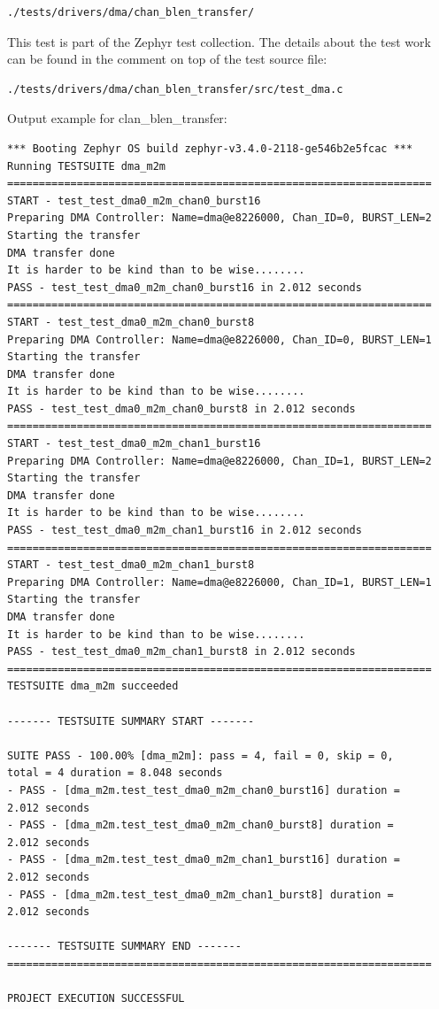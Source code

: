 \documentclass[11pt,a4paper,oneside]{article}
\begin{document}
\begin{lstlisting}
./tests/drivers/dma/chan_blen_transfer/
\end{lstlisting}

This test is part of the Zephyr test collection. The details about the
test work can be found in the comment on top of the test source file:
\begin{lstlisting}
./tests/drivers/dma/chan_blen_transfer/src/test_dma.c
\end{lstlisting}

Output example for clan\_blen\_transfer:

\begin{lstlisting}
*** Booting Zephyr OS build zephyr-v3.4.0-2118-ge546b2e5fcac ***
Running TESTSUITE dma_m2m
===================================================================
START - test_test_dma0_m2m_chan0_burst16
Preparing DMA Controller: Name=dma@e8226000, Chan_ID=0, BURST_LEN=2
Starting the transfer
DMA transfer done
It is harder to be kind than to be wise........
PASS - test_test_dma0_m2m_chan0_burst16 in 2.012 seconds
===================================================================
START - test_test_dma0_m2m_chan0_burst8
Preparing DMA Controller: Name=dma@e8226000, Chan_ID=0, BURST_LEN=1
Starting the transfer
DMA transfer done
It is harder to be kind than to be wise........
PASS - test_test_dma0_m2m_chan0_burst8 in 2.012 seconds
===================================================================
START - test_test_dma0_m2m_chan1_burst16
Preparing DMA Controller: Name=dma@e8226000, Chan_ID=1, BURST_LEN=2
Starting the transfer
DMA transfer done
It is harder to be kind than to be wise........
PASS - test_test_dma0_m2m_chan1_burst16 in 2.012 seconds
===================================================================
START - test_test_dma0_m2m_chan1_burst8
Preparing DMA Controller: Name=dma@e8226000, Chan_ID=1, BURST_LEN=1
Starting the transfer
DMA transfer done
It is harder to be kind than to be wise........
PASS - test_test_dma0_m2m_chan1_burst8 in 2.012 seconds
===================================================================
TESTSUITE dma_m2m succeeded

------- TESTSUITE SUMMARY START -------

SUITE PASS - 100.00% [dma_m2m]: pass = 4, fail = 0, skip = 0,
total = 4 duration = 8.048 seconds
- PASS - [dma_m2m.test_test_dma0_m2m_chan0_burst16] duration =
2.012 seconds
- PASS - [dma_m2m.test_test_dma0_m2m_chan0_burst8] duration =
2.012 seconds
- PASS - [dma_m2m.test_test_dma0_m2m_chan1_burst16] duration =
2.012 seconds
- PASS - [dma_m2m.test_test_dma0_m2m_chan1_burst8] duration =
2.012 seconds

------- TESTSUITE SUMMARY END -------
===================================================================

PROJECT EXECUTION SUCCESSFUL
\end{lstlisting}
\end{document}
